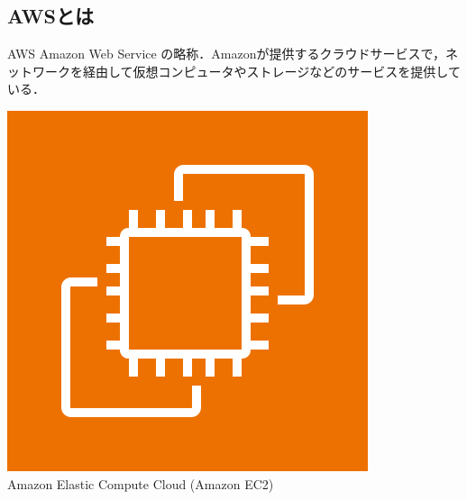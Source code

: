 \subsection{AWSとは}
\begin{frame}[t]{\ftitle}
    \begin{block}{AWS}
        Amazon Web Service の略称．Amazonが提供するクラウドサービスで，ネットワークを経由して仮想コンピュータやストレージなどのサービスを提供している．\hfill\cite{2015amazon}
    \end{block}
    \begin{minipage}{\textwidth}
        \centering
        \begin{minipage}[t]{.32\textwidth}
            \centering
            \includegraphics[keepaspectratio,width=\textwidth]{Arch_Amazon-EC2_64@5x.png}\\
            {\tiny Amazon Elastic Compute Cloud (Amazon EC2)\cite{aws}}
        \end{minipage}
        \begin{minipage}[t]{.32\textwidth}
            \centering

\end{minipage}
\end{minipage}
\end{frame}
